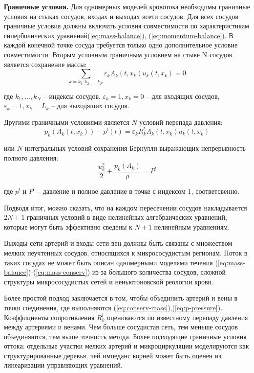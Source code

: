 {\bf Граничные условия.}
Для одномерных моделей кровотока необходимы граничные условия на стыках сосудов, входах и выходах всети сосудов. Для всех сосудов граничные условия должны включать условия совместимости по характеристикам гиперболических уравнений(\ref{eq:mass-balance}), (\ref{eq:momentum-balance}).
В каждой конечной точке сосуда требуется только одно дополнительное условие совместимости.
Вторым условным граничным условием на стыке N сосудов является сохранение массы:
\begin{equation}
    \label{eq:conserv-mass}
    \sum_{k=k_1,k_2,...,k_N} \varepsilon_k A_k(t,x_k)u_k(t,x_k)=0
\end{equation}

где {$k_1,...,k_N$} -- индексы сосудов, $\varepsilon_k=1, x_k=0$ -- для входящих сосудов, $\varepsilon_k=1, x_k=L_k$ -- для выходящих сосудов.

Другими граничными условиями является $N$ условий перепада давления:
\begin{equation}
    \label{eq:p-pressure}
    p_k\left(A_k(t,x_k)\right)-p^l(t)=\varepsilon_k R^l_k A_k(t,x_k)u_k(t,x_k)
\end{equation}

или $N$ интегральных условий сохранения Бернулли выражающих непрерывность полного давления:
\begin{equation}
    \label{eq:bernulli}
    \frac{u^2_k}{2}+\frac{p_k(A_k)}{\rho}=P^l
\end{equation}

где $p^l$ и $P^l$ -- давление и полное давление в точке с индексом 1, соответсвенно.

Подводя итог, можно сказать, что на каждом пересечении сосудов накладывается $2N + 1 $ граничных условий в виде нелинейных алгебраических уравнений, которые могут быть 
эффективно сведены к $N + 1$ нелинейным уравнениям.

Выходы сети артерий и входы сети вен должны быть связаны с множеством мелких неучтенных сосудов, относящихся к микрососудистым регионам. Поток в таких сосудах не может быть описан одномерными моделями течения (\ref{eq:mass-balance})-(\ref{eq:mass-conserv}) из-за большого количества сосудов, сложной структуры микрососудистых сетей и неньютоновской реологии крови.

Более простой подход заключается в том, чтобы объединить артерий и вены в точки соединения, где выполняются (\ref{eq:conserv-mass}),(\ref{eq:p-pressure}). Коэффициенты сопротивления $ R^l_k$ оцениваются  по известному перепаду давления между артериями и венами. Чем больше сосудистая сеть, тем меньше сосудов объединяются, тем выше точность метода. Более подходящие граничные условия оттока: отдельные участки мелких артерий и микроциркуляции моделируются как структурированные деревья, чей импеданс корней может быть оценен из линеаризации управляющих уравнений.

